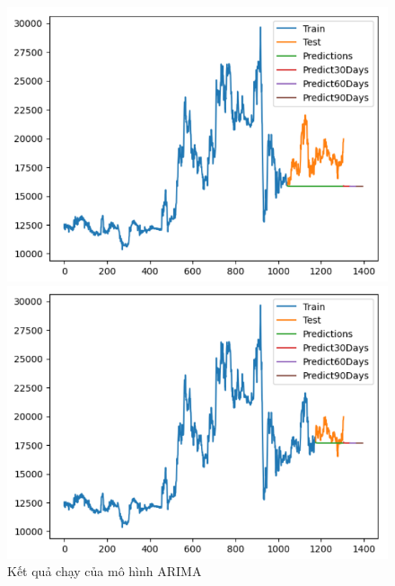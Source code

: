 \begin{figure}[H]
\begin{minipage}{0.15\textwidth}
    \includegraphics[width=1\textwidth]{resources/chapter-5/newdata1/result/EIB_ARIMA_8-2.png}
    \end{minipage}
    \hfill
        \begin{minipage}{0.15\textwidth}
    \centering
    \includegraphics[width=1\textwidth]{resources/chapter-5/newdata1/result/EIB_ARIMA_9-1.png}
    \end{minipage}
    \hfill
    
    \caption{Kết quả chạy của mô hình ARIMA}
    \label{fig:arima_result}
\end{figure}


